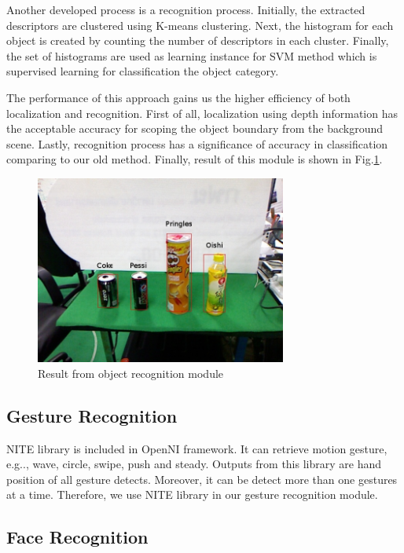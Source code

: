 \documentclass{llncs}
\begin{document}
Another developed process is a recognition process. Initially, the extracted descriptors are clustered using K-means clustering. Next, the histogram for each object is created by counting the number of descriptors in each cluster. Finally, the set of histograms are used as learning instance for SVM method which is supervised learning for classification the object category\cite{obj_rec}.

The performance of this approach gains us the higher efficiency of both localization and recognition. First of all, localization using depth information has the acceptable accuracy for scoping the object boundary from the background scene. Lastly, recognition process has a significance of accuracy in classification comparing to our old method. Finally, result of this module is shown in Fig.\ref{fig:object_recog}.

\begin{figure}
\centering
\includegraphics[height=6.2cm]{object_recognition_figure}
\caption{Result from object recognition module}
\label{fig:object_recog}
\end{figure}

\subsection{Gesture Recognition}

NITE library is included in OpenNI framework. It can retrieve motion gesture, e.g.., wave, circle, swipe, push and steady. Outputs from this library are hand position of all gesture detects. Moreover, it can be detect more than one gestures at a time. Therefore, we use NITE library in our gesture recognition module.

\subsection{Face Recognition}
\end{document}

